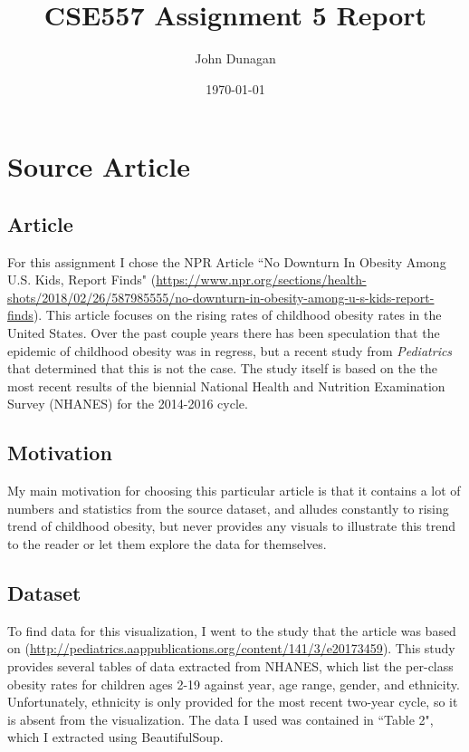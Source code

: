 \documentclass{article}
\title{CSE557 Assignment 5 Report}
\author{John Dunagan}
\date{\today}
\begin{document}
\maketitle

\section{Source Article}

\subsection{Article}

For this assignment I chose the NPR Article ``No Downturn In Obesity Among U.S. Kids, Report Finds" (\url{https://www.npr.org/sections/health-shots/2018/02/26/587985555/no-downturn-in-obesity-among-u-s-kids-report-finds}).  This article focuses on the rising rates of childhood obesity rates in the United States.   Over the past couple years there has been speculation that the epidemic of childhood obesity was in regress, but a recent study from \textit{Pediatrics} that determined that this is not the case.  The study itself is based on the the most recent results of the biennial National Health and Nutrition Examination Survey (NHANES) for the 2014-2016 cycle.

\subsection{Motivation}

My main motivation for choosing this particular article is that it contains a lot of numbers and statistics from the source dataset, and alludes constantly to rising trend of childhood obesity, but never provides any visuals to illustrate this trend to the reader or let them explore the data for themselves.   

\subsection{Dataset}

To find data for this visualization, I went to the study that the article was based on (\url{http://pediatrics.aappublications.org/content/141/3/e20173459}).  This study provides several tables of data extracted from NHANES, which list the per-class obesity rates for children ages 2-19 against year, age range, gender, and ethnicity.  Unfortunately, ethnicity is only provided for the most recent two-year cycle, so it is absent from the visualization.  The data I used was contained in ``Table 2", which I extracted using BeautifulSoup.
\end{document}
